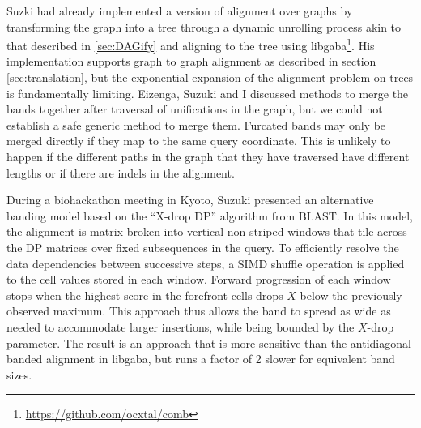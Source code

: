 \documentclass[a4paper,12pt,numbered,oneside]{Classes/PhDThesisPSnPDF}
\begin{document}
Suzki had already implemented a version of alignment over graphs by transforming the graph into a tree through a dynamic unrolling process akin to that described in \ref{sec:DAGify} and aligning to the tree using libgaba\footnote{\url{https://github.com/ocxtal/comb}}.
His implementation supports graph to graph alignment as described in section \ref{sec:translation}, but the exponential expansion of the alignment problem on trees is fundamentally limiting.
Eizenga, Suzuki and I discussed methods to merge the bands together after traversal of unifications in the graph, but we could not establish a safe generic method to merge them.
Furcated bands may only be merged directly if they map to the same query coordinate.
This is unlikely to happen if the different paths in the graph that they have traversed have different lengths or if there are indels in the alignment.

During a biohackathon meeting in Kyoto, Suzuki presented an alternative banding model based on the ``X-drop DP'' algorithm from BLAST.
In this model, the alignment is matrix broken into vertical non-striped windows that tile across the DP matrices over fixed subsequences in the query.
To efficiently resolve the data dependencies between successive steps, a SIMD shuffle operation is applied to the cell values stored in each window.
Forward progression of each window stops when the highest score in the forefront cells drops $X$ below the previously-observed maximum.
This approach thus allows the band to spread as wide as needed to accommodate larger insertions, while being bounded by the $X$-drop parameter.
The result is an approach that is more sensitive than the antidiagonal banded alignment in libgaba, but runs a factor of 2 slower for equivalent band sizes.
\end{document}
